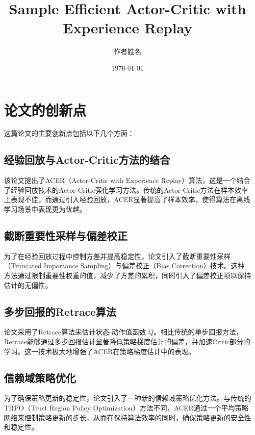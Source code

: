 \documentclass[twocolumn, 10pt]{article} %
\theoremstyle{remark}
\begin{document}
\title{Sample Efficient Actor-Critic with Experience Replay}
\author{作者姓名}
\date{\today}
\maketitle

\section{论文的创新点}

这篇论文的主要创新点包括以下几个方面：

\subsection{经验回放与Actor-Critic方法的结合}

该论文提出了ACER（Actor-Critic with Experience Replay）算法，这是一个结合了经验回放技术的Actor-Critic强化学习方法。传统的Actor-Critic方法在样本效率上表现不佳，而通过引入经验回放，ACER显著提高了样本效率，使得算法在离线学习场景中表现更为优越。

\subsection{截断重要性采样与偏差校正}

为了在经验回放过程中控制方差并提高稳定性，论文引入了截断重要性采样（Truncated Importance Sampling）与偏差校正（Bias Correction）技术。这种方法通过限制重要性权重的值，减少了方差的累积，同时引入了偏差校正项以保持估计的无偏性。

\subsection{多步回报的Retrace算法}

论文采用了Retrace算法来估计状态-动作值函数 \(Q\)。相比传统的单步回报方法，Retrace能够通过多步回报估计显著降低策略梯度估计的偏差，并加速Critic部分的学习。这一技术极大地增强了ACER在策略梯度估计中的表现。

\subsection{信赖域策略优化}

为了确保策略更新的稳定性，论文引入了一种新的信赖域策略优化方法。与传统的TRPO（Trust Region Policy Optimization）方法不同，ACER通过一个平均策略网络来控制策略更新的步长，从而在保持算法效率的同时，确保策略更新的安全性和稳定性。
\end{document}
